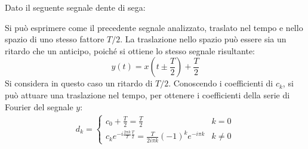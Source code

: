 \documentclass{article}
\begin{document}
Dato il seguente segnale dente di sega:
\begin{center}
\end{center}
Si può esprimere come il precedente segnale analizzato, traslato nel tempo e nello spazio di uno stesso fattore $T/2$. La traslazione nello spazio può essere sia un ritardo 
che un anticipo, poiché si ottiene lo stesso segnale risultante:
\begin{equation*}
    y(t)=x\left(t\pm\frac{T}{2}\right)+\displaystyle\frac{T}{2}
\end{equation*}
Si considera in questo caso un ritardo di $T/2$. Conoscendo i coefficienti di $c_k$, si può attuare una traslazione nel tempo, per ottenere i coefficienti della serie di Fourier 
del segnale $y$:
\begin{gather}
    d_k=\begin{cases}
        \displaystyle c_0+\frac{T}{2}=\frac{T}{2} &k=0\\
        c_ke^{-i\frac{2\pi k}{T}\frac{T}{2}}=\displaystyle\frac{T}{2i\pi k}(-1)^ke^{-i\pi k}&k\neq0
    \end{cases}
\end{gather}
\end{document}
